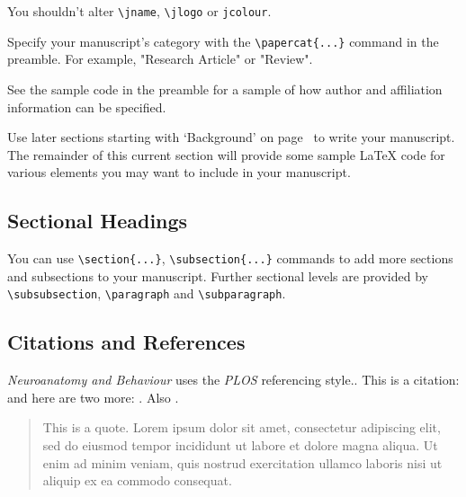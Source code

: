 \documentclass[a4paper,num-refs]{ehi-journals}
\begin{document}
You shouldn't alter \verb|\jname|, \verb|\jlogo| or \verb|jcolour|.

Specify your manuscript's category with the \verb|\papercat{...}| command in the preamble. For example, "Research Article" or "Review".

See the sample code in the preamble for a sample of how author and affiliation information can be specified.

Use later sections starting with `Background' on page~\pageref{sec:background} to write your manuscript. The remainder of this current section will provide some sample \LaTeX{} code for various elements you may want to include in your manuscript.

\subsection{Sectional Headings}
You can use \verb|\section{...}|, \verb|\subsection{...}| commands to add more sections and subsections to your manuscript. Further sectional levels are provided by \verb|\subsubsection|, \verb|\paragraph| and \verb|\subparagraph|.

\subsection{Citations and References}
\emph{Neuroanatomy and Behaviour} uses the \emph{PLOS} referencing style..
This is a citation: \cite{Fan:2004} and here are two more: \cite{Cox:1972,Hear:Holm:Step:quan:2006}. Also \cite{Anderberg83}.

\begin{quote}
This is a quote. Lorem ipsum dolor sit amet, consectetur adipiscing elit, sed do eiusmod tempor incididunt ut labore et dolore magna aliqua. Ut enim ad minim veniam, quis nostrud exercitation ullamco laboris nisi ut aliquip ex ea commodo consequat. 
\end{quote}
\end{document}
